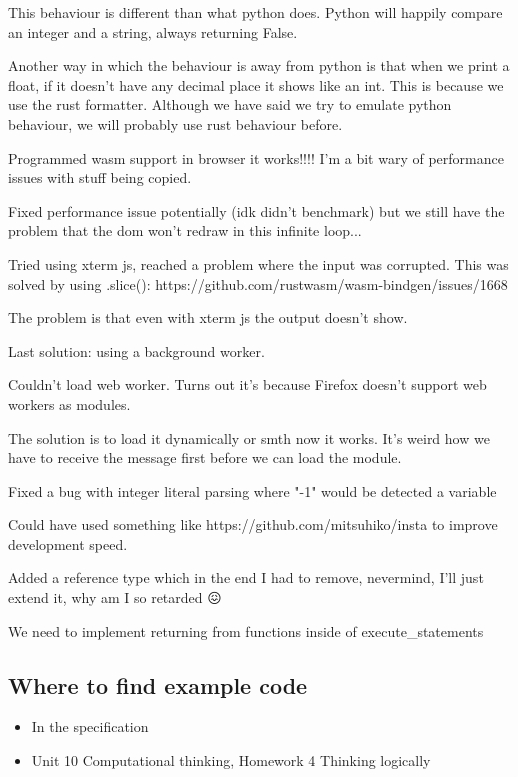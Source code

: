 \documentclass{article}
\begin{document}
This behaviour is different than what python does. Python will happily compare
an integer and a string, always returning False.

Another way in which the behaviour is away from python is that when we print a
float, if it doesn't have any decimal place it shows like an int. This is
because we use the rust formatter. Although we have said we try to emulate
python behaviour, we will probably use rust behaviour before.

Programmed wasm support in browser it works!!!! I'm a bit wary of performance
issues with stuff being copied.

Fixed performance issue potentially (idk didn't benchmark) but we still have
the problem that the dom won't redraw in this infinite loop...

Tried using xterm js, reached a problem where the input was corrupted. This was
solved by using .slice(): https://github.com/rustwasm/wasm-bindgen/issues/1668

The problem is that even with xterm js the output doesn't show.

Last solution: using a background worker.

Couldn't load web worker. Turns out it's because Firefox doesn't support web
workers as modules.

The solution is to load it dynamically or smth now it works. It's weird how we
have to receive the message first before we can load the module.

Fixed a bug with integer literal parsing where "-1" would be detected a
variable

Could have used something like https://github.com/mitsuhiko/insta to improve
development speed.

Added a reference type which in the end I had to remove, nevermind, I'll just
extend it, why am I so retarded 😖

We need to implement returning from functions inside of execute\_statements

\subsection{Where to find example code}

\begin{itemize}
	\item In the specification
	\item Unit 10 Computational thinking, Homework 4 Thinking logically
\end{itemize}

\printbibliography[heading=bibintoc]
\end{document}
